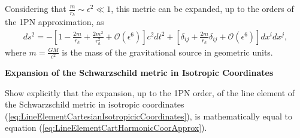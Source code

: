 Considering that $  \frac{m}{r_h} \sim \epsilon^2 \ll 1$, this metric can be expanded, up to the orders of the 1PN approximation, as 
 \begin{align}
 ds^2 = - \left[ 1-\frac{2m}{r_h} +\frac{2m^2}{r_h^2} + \mathcal{O} ( \epsilon ^6 )  \right] c^2 dt^2 + \left[ \delta_{ij} + \frac{2 m}{r_h} \delta_{ij}  + \mathcal{O} ( \epsilon^6 ) \right] dx^i dx^j ,\label{eq:LineElementCartHarmonicCoorApprox}
 \end{align}
where $m=\frac{GM}{c^2}$ is the mass of the gravitational source in geometric units. 

\begin{exercise}[ExpansionSchwarzschildIsotropic]
\textbf{Expansion of the Schwarzschild metric in Isotropic Coordinates}

Show explicitly that the expansion, up to the 1PN order, of the line element of the Schwarzschild metric in isotropic coordinates (\ref{eq:LineElementCartesianIsotropicicCoordinates}), is mathematically equal to equation (\ref{eq:LineElementCartHarmonicCoorApprox}).
\end{exercise}


